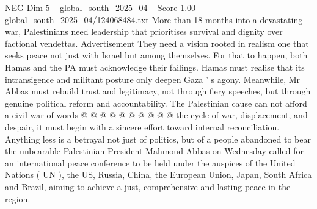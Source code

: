 \begin{textsample}{NEG Dim 5 – global\_south\_2025\_04 – Score 1.00 – global\_south\_2025\_04/124068484.txt}
More than 18 months into a devastating war, Palestinians need leadership that prioritises survival and dignity over factional vendettas.
Advertisement They need a vision rooted in realism one that seeks peace not just with Israel but among themselves.
For that to happen, both Hamas and the PA must acknowledge their failings.
Hamas must realise that its intransigence and militant posture only deepen Gaza ' s agony.
Meanwhile, Mr Abbas must rebuild trust and legitimacy, not through fiery speeches, but through genuine political reform and accountability.
The Palestinian cause can not afford a civil war of words @ @ @ @ @ @ @ @ @ @ the cycle of war, displacement, and despair, it must begin with a sincere effort toward internal reconciliation.
Anything less is a betrayal not just of politics, but of a people abandoned to bear the unbearable Palestinian President Mahmoud Abbas on Wednesday called for an international peace conference to be held under the auspices of the United Nations ( UN ), the US, Russia, China, the European Union, Japan, South Africa and Brazil, aiming to achieve a just, comprehensive and lasting peace in the region.

\end{textsample}
